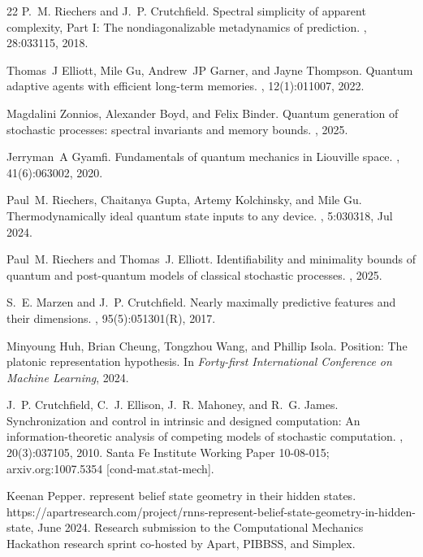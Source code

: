 \documentclass[prx,nofootinbib,onecolumn,showkeys,groupaddress,preprintnumbers,floatfix,
superscriptaddress]{revtex4-1}
\begin{document}
\begin{thebibliography}{22}
P.~M. Riechers and J.~P. Crutchfield.
\newblock Spectral simplicity of apparent complexity, {Part I}: {The} nondiagonalizable metadynamics of prediction.
, 28:033115, 2018.

Thomas~J Elliott, Mile Gu, Andrew~JP Garner, and Jayne Thompson.
\newblock Quantum adaptive agents with efficient long-term memories.
, 12(1):011007, 2022.

Magdalini Zonnios, Alexander Boyd, and Felix Binder.
\newblock Quantum generation of stochastic processes: spectral invariants and memory bounds.
, 2025.

Jerryman~A Gyamfi.
\newblock Fundamentals of quantum mechanics in {L}iouville space.
, 41(6):063002, 2020.

Paul~M. Riechers, Chaitanya Gupta, Artemy Kolchinsky, and Mile Gu.
\newblock Thermodynamically ideal quantum state inputs to any device.
, 5:030318, Jul 2024.

Paul~M. Riechers and Thomas~J. Elliott.
\newblock Identifiability and minimality bounds of quantum and post-quantum models of classical stochastic processes.
, 2025.

S.~E. Marzen and J.~P. Crutchfield.
\newblock Nearly maximally predictive features and their dimensions.
, 95(5):051301(R), 2017.

Minyoung Huh, Brian Cheung, Tongzhou Wang, and Phillip Isola.
\newblock Position: The platonic representation hypothesis.
\newblock In {\em Forty-first International Conference on Machine Learning}, 2024.

J.~P. Crutchfield, C.~J. Ellison, J.~R. Mahoney, and R.~G. James.
\newblock Synchronization and control in intrinsic and designed computation: {An} information-theoretic analysis of competing models of stochastic computation.
, 20(3):037105, 2010.
\newblock Santa Fe Institute Working Paper 10-08-015; arxiv.org:1007.5354 [cond-mat.stat-mech].

Keenan Pepper.
 represent belief state geometry in their hidden states.
\newblock https://apartresearch.com/project/rnns-represent-belief-state-geometry-in-hidden-state, June 2024.
\newblock Research submission to the {C}omputational {M}echanics {H}ackathon research sprint co-hosted by Apart, PIBBSS, and Simplex.


\end{thebibliography}
\end{document}
